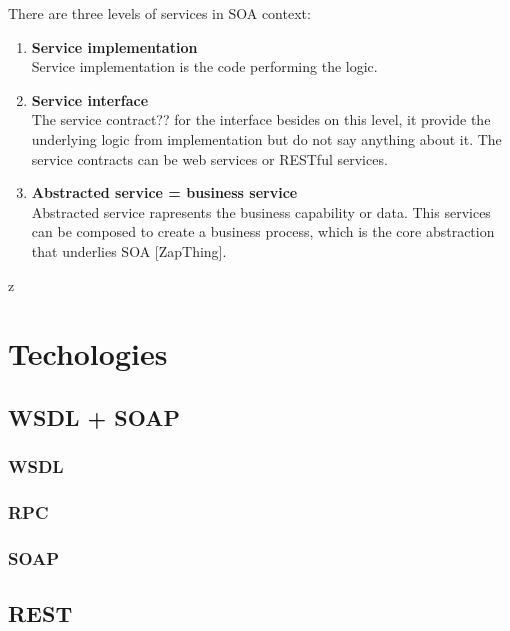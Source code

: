 There are three levels of services in SOA context:
\begin{enumerate}
  \item \textbf{Service implementation} \hfill \\
Service implementation is the code performing the logic.
  \item \textbf{Service interface} \hfill \\ 
The service contract?? for the interface besides on this level, it provide the underlying logic from implementation but do not say anything about it. The service contracts can be web services or RESTful services.
  \item \textbf{Abstracted service = business service} \hfill \\
Abstracted service rapresents the business capability or data. This services can be composed to create a business process, which is the core abstraction that underlies SOA [ZapThing].
\end{enumerate}


z



\section{Techologies}

\subsection{WSDL + SOAP}
\subsubsection{WSDL}
\subsubsection{RPC}
\subsubsection{SOAP}

\subsection{REST}

